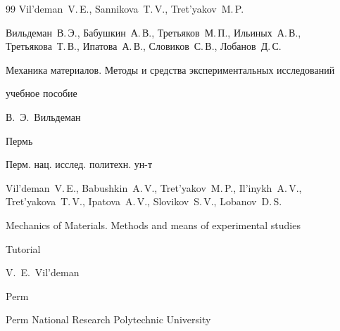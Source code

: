 \begin{thebibliography}{99}
\by Vil'deman~V.\,E., Sannikova~T.\,V., Tret'yakov~M.\,P.



\pagebreak




\by Вильдеман~В.\,Э., Бабушкин~А.\,В., Третьяков~М.\,П., Ильиных~А.\,В., Третьякова~Т.\,В., Ипатова~А.\,В., Словиков~С.\,В., Лобанов~Д.\,С. 

\book Механика материалов. Методы и средства экспериментальных исследований

\bookinfo учебное пособие

\ed В.~Э.~Вильдеман

\publaddr Пермь

\publ Перм. нац. исслед. политехн. ун-т



\misctransl

\by Vil'deman~V.\,E., Babushkin~A.\,V., Tret'ya\-kov~M.\,P., Il'inykh~A.\,V., Tret'yakova~T.\,V., Ipatova~A.\,V., Slovikov~S.\,V., Lobanov~D.\,S.

\book Mechanics of Materials. Methods and means of experimental studies

\bookinfo Tutorial

\ed V.~E.~Vil'deman

\publaddr Perm

\publ Perm National Research Polytechnic University











\end{thebibliography}



\noindent

\hskip6.5cm \thedate \par\noindent

\hskip6.5cm\therevdate





\makeengtitlem







\newpage

%



%

